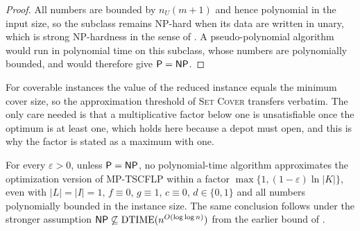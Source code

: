 \begin{proof}
All numbers are bounded by $n_U(m+1)$ and hence polynomial in the input
size, so the subclass remains NP-hard when its data are written in
unary, which is strong NP-hardness in the sense of
\citet{GareyJohnson1979}. A pseudo-polynomial algorithm would run in
polynomial time on this subclass, whose numbers are polynomially
bounded, and would therefore give $\textsf{P}=\textsf{NP}$.
\end{proof}

For coverable instances the value of the reduced instance equals the
minimum cover size, so the approximation threshold of \textsc{Set Cover} transfers verbatim.
The only care needed is that a multiplicative factor below one is
unsatisfiable once the optimum is at least one, which holds here because
a depot must open, and this is why the factor is stated as a maximum
with one.

\begin{corollary}\label{cor:coverinapprox}
For every $\varepsilon>0$, unless $\textsf{P}=\textsf{NP}$, no polynomial-time
algorithm approximates the optimization version of MP-TSCFLP within a
factor $\max\{1,(1-\varepsilon)\ln|K|\}$, even with $|L|=|I|=1$,
$f\equiv 0$, $g\equiv 1$, $c\equiv 0$, $d\in\{0,1\}$ and all numbers
polynomially bounded in the instance size. The same conclusion follows under the stronger
assumption $\textsf{NP}\not\subseteq\mathrm{DTIME}(n^{O(\log\log n)})$ from the
earlier bound of \citet{Feige1998}.
\end{corollary}

